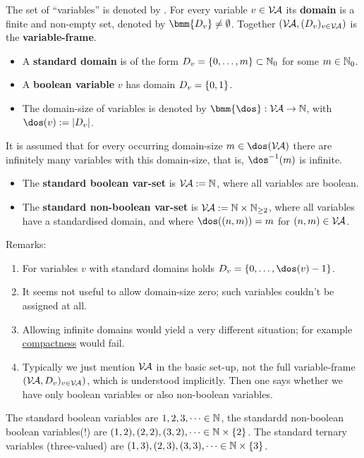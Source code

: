 \documentclass[12pt]{book}
\begin{document}
\begin{defi}\label{def:var}
  The set of ``variables'' is denoted by \bmm{\Va}. For every variable $v \in \mathcal{V\hspace{-0.1em}A}$ its \textbf{domain} is a finite and non-empty set, denoted by $\bmm{D_v} \ne \es$. Together $(\mathcal{V\hspace{-0.1em}A}, (D_v)_{v \in \mathcal{V\hspace{-0.1em}A}})$ is the \textbf{variable-frame}.
  \begin{itemize}
  \item A \textbf{standard domain} is of the form $D_v = \{ 0, \dots, m \} \subset \mathbb{N}_0$ for some $m \in \mathbb{N}_0$.
  \item A \textbf{boolean variable} $v$ has domain $D_v = \{ 0,1 \}$.
  \item The domain-size of variables is denoted by $\bmm{\dos}: \Va \ra \NN$, with $\dos(v) := \abs{D_v}$.
  \end{itemize}
  It is assumed that for every occurring domain-size $m \in \dos(\Va)$ there are infinitely many variables with this domain-size, that is, $\dos^{-1}(m)$ is infinite.
  \begin{itemize}
  \item The \textbf{standard boolean var-set} is $\mathcal{V\hspace{-0.1em}A} := \mathbb{N}$, where all variables are boolean.
  \item The \textbf{standard non-boolean var-set} is $\mathcal{V\hspace{-0.1em}A} := \mathbb{N} \times \mathbb{N}_{\ge2}$, where all variables have a standardised domain, and where $\dos((n,m)) = m$ for $(n,m) \in \mathcal{V\hspace{-0.1em}A}$.
  \end{itemize}
\end{defi}
Remarks:
\begin{enumerate}
\item For variables $v$ with standard domains holds $D_v = \tb{0}{\dos(v)-1}$.
\item It seems not useful to allow domain-size zero; such variables couldn't be assigned at all.
\item Allowing infinite domains would yield a very different situation; for example \href{https://en.wikipedia.org/wiki/Compact_space}{compactness} would fail.
\item Typically we just mention $\mathcal{V\hspace{-0.1em}A}$ in the basic set-up, not the full variable-frame $(\mathcal{V\hspace{-0.1em}A},
D_v)_{v \in \mathcal{V\hspace{-0.1em}A}})$, which is understood implicitly. Then one says whether we have only boolean variables or also non-boolean variables.
\end{enumerate}

\begin{examp}\label{exp:var}
  The standard boolean variables are $1, 2, 3, \dots \in \mathbb{N}$, the standardd non-boolean boolean variables(!) are $(1,2), (2,2), (3,2), \dots \in \mathbb{N} \times \{ 2 \}$. The standard ternary variables (three-valued) are $(1,3), (2,3), (3,3), \dots \in \mathbb{N} \times \{ 3 \}$.
\end{examp}
\end{document}
